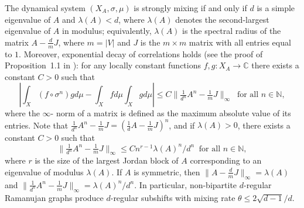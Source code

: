 \documentclass[12pt]{article}
\theoremstyle{definition}
\begin{document}
The dynamical system $(X_A,\sigma,\mu)$ is strongly mixing if and only if $d$ is a simple eigenvalue of $A$ and  $\lambda(A)<d$, where $\lambda(A)$ denotes the second-largest eigenvalue of $A$ in modulus; equivalently, $\lambda(A)$ is the spectral radius of the matrix $A-\frac{d}{m}J$, where $m=|V|$ and $J$ is the $m\times m$ matrix with all entries equal to $1$. Moreover, exponential decay of correlations holds (see the proof of Proposition~1.1 in \cite{Baladi}): for any locally constant functions $f,g:X_A\rightarrow\mathbb{C}$ there exists a constant $C>0$ such that
\begin{equation}\label{eqn:subshift_exp_decay}
\left|\int_{X} (f\circ\sigma^n)gd\mu - \int_{X}fd\mu\int_{X}gd\mu\right|\leq C\|\tfrac{1}{d^n}A^n-\tfrac{1}{m}J\|_{\infty} \ \mbox{ for all $n\in\mathbb{N}$},
\end{equation}
where the $\infty$- norm of a matrix is defined as the maximum  absolute value  of its entries.
Note that $\tfrac{1}{d^n}A^n-\tfrac{1}{m}J=(\tfrac{1}{d}A-\tfrac{1}{m}J)^n$, and if $\lambda(A)>0$, there exists a constant $C>0$ such that
\[
\|\tfrac{1}{d^n}A^n-\tfrac{1}{m}J\|_{\infty}\leq Cn^{r-1}\lambda(A)^n/d^n \ \mbox{ for all $n\in\mathbb{N}$},
\]
where $r$ is the size of the largest Jordan block of $A$ corresponding to an eigenvalue of modulus $\lambda(A)$.
If $A$ is symmetric, then $\|A-\tfrac{d}{m}J\|_{\infty}=\lambda(A)$ and $\|\tfrac{1}{d^n}A^n-\tfrac{1}{m}J\|_{\infty}=\lambda(A)^n/d^n$. In particular, non-bipartite $d$-regular Ramanujan graphs produce $d$-regular subshifts with mixing rate $\theta\leq 2\sqrt{d-1}/d$.
\end{document}

